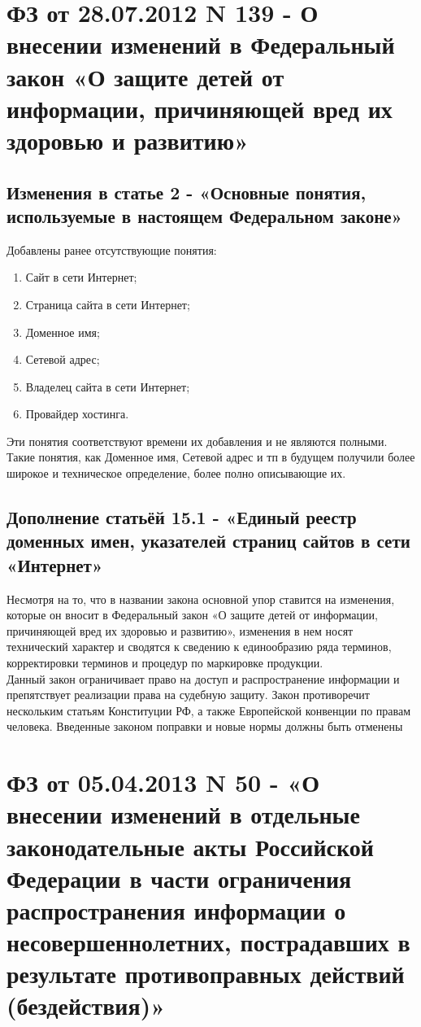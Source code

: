 \documentclass[14pt,a4paper,report]{article}
\begin{document}
\newpage

\section{ФЗ от 28.07.2012 N 139 - О внесении изменений в Федеральный закон «О защите детей от информации, причиняющей вред их здоровью и развитию»}

\subsection{Изменения в статье 2 - «Основные понятия, используемые в настоящем Федеральном законе»}
Добавлены ранее отсутствующие понятия:
\begin{enumerate}
	\item Сайт в сети Интернет;
	\item Страница сайта в сети Интернет;
	\item Доменное имя;
	\item Сетевой адрес;
	\item Владелец сайта в сети Интернет;
	\item Провайдер хостинга.
\end{enumerate}

Эти понятия соответствуют времени их добавления и не являются полными. Такие понятия, как Доменное имя, Сетевой адрес и тп в будущем получили более широкое и техническое определение, более полно описывающие их.

\subsection{Дополнение статьёй 15.1 - «Единый реестр доменных имен, указателей страниц сайтов в сети «Интернет»}
Несмотря на то, что в названии закона основной упор ставится на изменения, которые он вносит в Федеральный закон «О защите детей от информации, причиняющей вред их здоровью и развитию», изменения в нем носят технический характер и сводятся к сведению к единообразию ряда терминов, корректировки терминов и процедур по маркировке продукции.\\

Данный закон ограничивает право на доступ и распространение информации и препятствует реализации права на судебную защиту. Закон противоречит нескольким статьям Конституции РФ, а также Европейской конвенции по правам человека. Введенные законом поправки и новые нормы должны быть отменены

\section{ФЗ от 05.04.2013 N 50 - «О внесении изменений в отдельные законодательные акты Российской Федерации в части ограничения распространения информации о несовершеннолетних, пострадавших в результате противоправных действий (бездействия)»}
\end{document}
